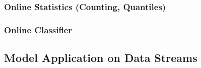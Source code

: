 \subsubsection*{Online Statistics (Counting, Quantiles)}

\subsubsection*{Online Classifier}

\subsubsection{}



\subsection{\label{sec:onlineApplication}Model Application on Data Streams}